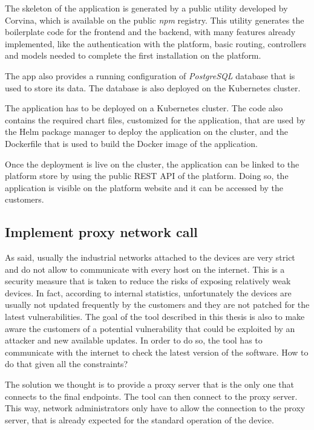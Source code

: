 The skeleton of the application is generated by a public utility developed by Corvina, which is available on the public \textit{npm} registry. This utility generates the boilerplate code for the frontend and the backend, with many features already implemented, like the authentication with the platform, basic routing, controllers and models needed to complete the first installation on the platform.

The app also provides a running configuration of \textit{PostgreSQL} database that is used to store its data. The database is also deployed on the Kubernetes cluster.

The application has to be deployed on a Kubernetes cluster. The code also contains the required chart files, customized for the application, that are used by the Helm package manager to deploy the application on the cluster, and the Dockerfile that is used to build the Docker image of the application.

Once the deployment is live on the cluster, the application can be linked to the platform store by using the public REST API of the platform. Doing so, the application is visible on the platform website and it can be accessed by the customers.

\subsection{Implement proxy network call}

As said, usually the industrial networks attached to the devices are very strict and do not allow to communicate with every host on the internet. This is a security measure that is taken to reduce the risks of exposing relatively weak devices. In fact, according to internal statistics, unfortunately the devices are usually not updated frequently by the customers and they are not patched for the latest vulnerabilities. The goal of the tool described in this thesis is also to make aware the customers of a potential vulnerability that could be exploited by an attacker and new available updates. In order to do so, the tool has to communicate with the internet to check the latest version of the software. How to do that given all the constraints?

The solution we thought is to provide a proxy server that is the only one that connects to the final endpoints. The tool can then connect to the proxy server. This way, network administrators only have to allow the connection to the proxy server, that is already expected for the standard operation of the device.

